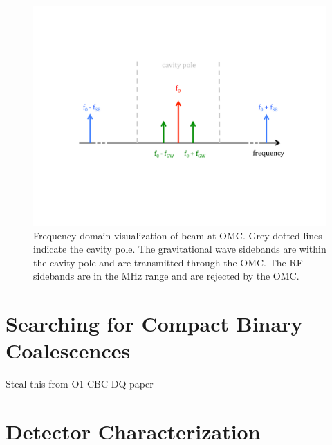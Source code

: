 \begin{figure}[ht!]
\includegraphics[width=\textwidth]{figures/introduction/omc-freq}
\caption[Sidebands and OMC cavity pole]{Frequency domain visualization of beam %
         at OMC. Grey dotted lines indicate the cavity pole. The gravitational %
         wave sidebands are within the cavity pole and are transmitted through %
         the OMC. The RF sidebands are in the MHz range and are rejected by the %
         OMC.}
\end{figure}\label{fig:omc-freq}

\section{Searching for Compact Binary Coalescences}

Steal this from O1 CBC DQ paper

\section{Detector Characterization}
